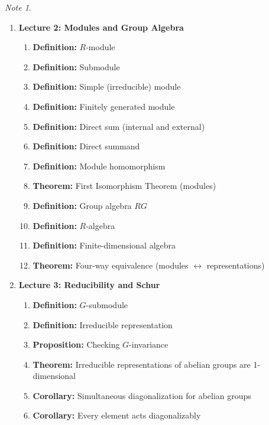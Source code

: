 \documentclass[titlepage]{article}
\theoremstyle{plain}
\theoremstyle{definition}
\theoremstyle{remark}
\newtheorem{note}{Note}
\theoremstyle{exercise-style}
\numberwithin{equation}{section}
\numberwithin{theorem}{section}
\numberwithin{remark}{section}
\begin{document}
\begin{myboxr}
\begin{note}
\begin{enumerate}
            \item \textbf{Lecture 2: Modules and Group Algebra}
            \begin{enumerate}
                \item \textbf{Definition:} $R$-module
                \item \textbf{Definition:} Submodule
                \item \textbf{Definition:} Simple (irreducible) module
                \item \textbf{Definition:} Finitely generated module
                \item \textbf{Definition:} Direct sum (internal and external)
                \item \textbf{Definition:} Direct summand
                \item \textbf{Definition:} Module homomorphism
                \item \textbf{Theorem:} First Isomorphism Theorem (modules)
                \item \textbf{Definition:} Group algebra $RG$
                \item \textbf{Definition:} $R$-algebra
                \item \textbf{Definition:} Finite-dimensional algebra
                \item \textbf{Theorem:} Four-way equivalence (modules $\leftrightarrow$ representations)
            \end{enumerate}
            
            \item \textbf{Lecture 3: Reducibility and Schur}
            \begin{enumerate}
                \item \textbf{Definition:} $G$-submodule
                \item \textbf{Definition:} Irreducible representation
                \item \textbf{Proposition:} Checking $G$-invariance
                \item \textbf{Theorem:} Irreducible representations of abelian groups are 1-dimensional
                \item \textbf{Corollary:} Simultaneous diagonalization for abelian groups
                \item \textbf{Corollary:} Every element acts diagonalizably
            \end{enumerate}
            

\end{enumerate}
\end{note}
\end{myboxr}
\end{document}
